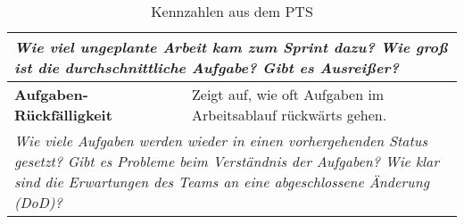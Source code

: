 \begin{table}[H]
\begin{tabular}{p{5cm}p{9.5cm}}
    \multicolumn{2}{p{14.5cm}}{\textit{Wie viel ungeplante Arbeit kam zum Sprint dazu? \newline Wie groß ist die durchschnittliche Aufgabe? Gibt es Ausreißer?}} \\ \midrule
    \textbf{Aufgaben-Rückfälligkeit} & Zeigt auf, wie oft Aufgaben im Arbeitsablauf rückwärts gehen. \\
    \multicolumn{2}{p{14.5cm}}{\textit{Wie viele Aufgaben werden wieder in einen vorhergehenden Status gesetzt? \newline Gibt es Probleme beim Verständnis der Aufgaben? \newline Wie klar sind die Erwartungen des Teams an eine abgeschlossene Änderung (DoD)?}} \\ \bottomrule
    \end{tabular}
    \caption{Kennzahlen aus dem \ac{PTS}}\label{metrics-table-pts}
  \end{table}
  
